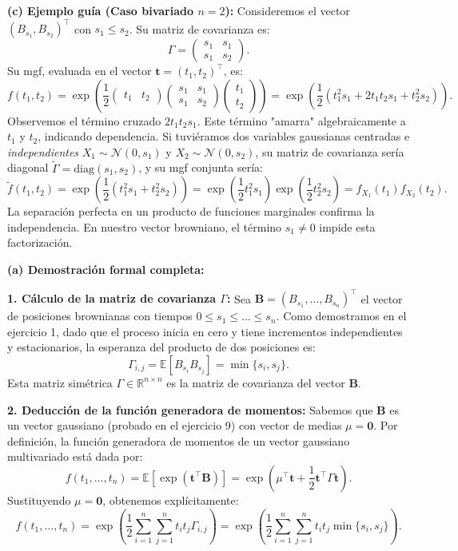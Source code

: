 \documentclass[11pt, letterpaper]{article}
\begin{document}
\begin{solucion}
    \vspace{3mm}
    \textbf{(c) Ejemplo guía (Caso bivariado $n=2$):}
    Consideremos el vector $(B_{s_1}, B_{s_2})^\top$ con $s_1 \le s_2$. Su matriz de covarianza es:
    $$\Gamma = \begin{pmatrix} s_1 & s_1 \\ s_1 & s_2 \end{pmatrix}.$$
    Su mgf, evaluada en el vector $\mathbf{t} = (t_1, t_2)^\top$, es:
    $$f(t_1, t_2) = \exp\left( \frac{1}{2} \begin{pmatrix} t_1 & t_2 \end{pmatrix} \begin{pmatrix} s_1 & s_1 \\ s_1 & s_2 \end{pmatrix} \begin{pmatrix} t_1 \\ t_2 \end{pmatrix} \right) = \exp\left( \frac{1}{2} (t_1^2 s_1 + 2t_1 t_2 s_1 + t_2^2 s_2) \right).$$
    Observemos el término cruzado $2t_1 t_2 s_1$. Este término "amarra" algebraicamente a $t_1$ y $t_2$, indicando dependencia. 
    Si tuviéramos dos variables gaussianas centradas e \textit{independientes} $X_1 \sim \mathcal{N}(0, s_1)$ y $X_2 \sim \mathcal{N}(0, s_2)$, su matriz de covarianza sería diagonal $\tilde{\Gamma} = \text{diag}(s_1, s_2)$, y su mgf conjunta sería:
    $$\tilde{f}(t_1, t_2) = \exp\left( \frac{1}{2} (t_1^2 s_1 + t_2^2 s_2) \right) = \exp\left( \frac{1}{2} t_1^2 s_1 \right) \exp\left( \frac{1}{2} t_2^2 s_2 \right) = f_{X_1}(t_1) f_{X_2}(t_2).$$
    La separación perfecta en un producto de funciones marginales confirma la independencia. En nuestro vector browniano, el término $s_1 \neq 0$ impide esta factorización.

    \vspace{3mm}
    \textbf{(a) Demostración formal completa:}

    \textbf{1. Cálculo de la matriz de covarianza $\Gamma$:}
    Sea $\mathbf{B} = (B_{s_1}, \dots, B_{s_n})^\top$ el vector de posiciones brownianas con tiempos $0 \le s_1 \le \dots \le s_n$.
    Como demostramos en el ejercicio 1, dado que el proceso inicia en cero y tiene incrementos independientes y estacionarios, la esperanza del producto de dos posiciones es:
    $$\Gamma_{i,j} = \mathbb{E}[B_{s_i} B_{s_j}] = \min\{s_i, s_j\}.$$
    Esta matriz simétrica $\Gamma \in \mathbb{R}^{n \times n}$ es la matriz de covarianza del vector $\mathbf{B}$.

    \textbf{2. Deducción de la función generadora de momentos:}
    Sabemos que $\mathbf{B}$ es un vector gaussiano (probado en el ejercicio 9) con vector de medias $\mu = \mathbf{0}$.
    Por definición, la función generadora de momentos de un vector gaussiano multivariado está dada por:
    $$f(t_1, \dots, t_n) = \mathbb{E}[\exp(\mathbf{t}^\top \mathbf{B})] = \exp\left( \mu^\top \mathbf{t} + \frac{1}{2} \mathbf{t}^\top \Gamma \mathbf{t} \right).$$
    Sustituyendo $\mu = \mathbf{0}$, obtenemos explícitamente:
    $$f(t_1, \dots, t_n) = \exp\left( \frac{1}{2} \sum_{i=1}^n \sum_{j=1}^n t_i t_j \Gamma_{i,j} \right) = \exp\left( \frac{1}{2} \sum_{i=1}^n \sum_{j=1}^n t_i t_j \min\{s_i, s_j\} \right).$$


\end{solucion}
\end{document}
